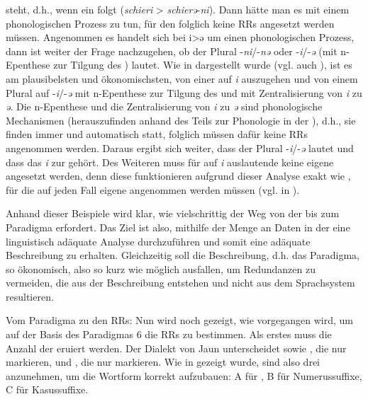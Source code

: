 steht, d.h., wenn ein  folgt (\textit{schieri} > \textit{schierə}-\textit{ni}). Dann hätte man es mit einem phonologischen Prozess zu tun, für den folglich keine RRs angesetzt werden müssen. Angenommen es handelt sich bei i>ə um einen phonologischen Prozess, dann ist weiter der Frage nachzugehen, ob der Plural -\textit{ni}/-\textit{nə}  oder -\textit{i}/-\textit{ə} (mit n-Epenthese zur Tilgung des ) lautet. Wie in  dargestellt wurde (vgl. auch ), ist es am plausibelsten und ökonomischsten, von einer  auf \textit{i} auszugehen und von einem Plural auf -\textit{i}/-\textit{ə} mit n-Epenthese zur Tilgung des  und mit Zentralisierung von \textit{i} zu \textit{ə}. Die n-Epenthese und die Zentralisierung von \textit{i} zu \textit{ə} sind phonologische Mechanismen (herauszufinden anhand des Teils zur Phonologie in der ), d.h., sie finden immer und automatisch statt, folglich müssen dafür keine RRs angenommen werden. Daraus ergibt sich weiter, dass der Plural -\textit{i}/-\textit{ə} lautet und dass das \textit{i} zur  gehört. Des Weiteren muss für auf \textit{i} auslautende  keine eigene  angesetzt werden, denn diese  funktionieren aufgrund dieser Analyse exakt wie , für die auf jeden Fall eigene  angenommen werden müssen (vgl.  in ).

Anhand dieser Beispiele wird klar, wie vielschrittig der Weg von der  bis zum Paradigma erfordert. Das Ziel ist also, mithilfe der Menge an Daten in der  eine linguistisch adäquate Analyse durchzuführen und somit eine adäquate Beschreibung zu erhalten. Gleichzeitig soll die Beschreibung, d.h. das Paradigma, so ökonomisch, also so kurz wie möglich ausfallen, um Redundanzen zu vermeiden, die aus der Beschreibung entstehen und nicht aus dem Sprachsystem resultieren.

{Vom Paradigma zu den RRs:} Nun wird noch gezeigt, wie vorgegangen wird, um auf der Basis des Paradigmas 6 die RRs zu bestimmen. Als erstes muss die Anzahl der  eruiert werden. Der Dialekt von Jaun unterscheidet  sowie , die nur  markieren, und , die nur  markieren. Wie in  gezeigt wurde, sind also drei  anzunehmen, um die Wortform korrekt aufzubauen:  A für ,  B für Numerussuffixe,  C für Kasussuffixe.

